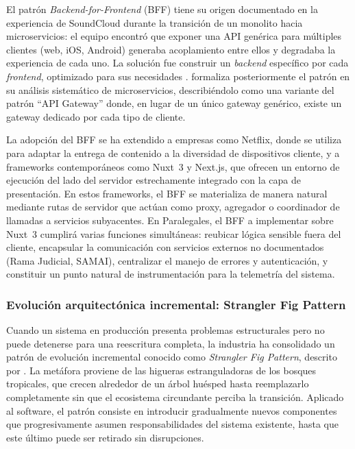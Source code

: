 El patrón \textit{Backend-for-Frontend} (BFF) tiene su origen documentado en la experiencia de SoundCloud durante la transición de un monolito hacia microservicios: el equipo encontró que exponer una API genérica para múltiples clientes (web, iOS, Android) generaba acoplamiento entre ellos y degradaba la experiencia de cada uno. La solución fue construir un \textit{backend} específico por cada \textit{frontend}, optimizado para sus necesidades \cite{NewmanBFF}. \textcite{Newman2021} formaliza posteriormente el patrón en su análisis sistemático de microservicios, describiéndolo como una variante del patrón ``API Gateway'' donde, en lugar de un único gateway genérico, existe un gateway dedicado por cada tipo de cliente.

La adopción del BFF se ha extendido a empresas como Netflix, donde se utiliza para adaptar la entrega de contenido a la diversidad de dispositivos cliente, y a frameworks contemporáneos como Nuxt~3 y Next.js, que ofrecen un entorno de ejecución del lado del servidor estrechamente integrado con la capa de presentación. En estos frameworks, el BFF se materializa de manera natural mediante rutas de servidor que actúan como proxy, agregador o coordinador de llamadas a servicios subyacentes. En Paralegales, el BFF a implementar sobre Nuxt~3 cumplirá varias funciones simultáneas: reubicar lógica sensible fuera del cliente, encapsular la comunicación con servicios externos no documentados (Rama Judicial, SAMAI), centralizar el manejo de errores y autenticación, y constituir un punto natural de instrumentación para la telemetría del sistema.

\subsubsection{Evolución arquitectónica incremental: Strangler Fig Pattern}

Cuando un sistema en producción presenta problemas estructurales pero no puede detenerse para una reescritura completa, la industria ha consolidado un patrón de evolución incremental conocido como \textit{Strangler Fig Pattern}, descrito por \textcite{Fowler2004Strangler}. La metáfora proviene de las higueras estranguladoras de los bosques tropicales, que crecen alrededor de un árbol huésped hasta reemplazarlo completamente sin que el ecosistema circundante perciba la transición. Aplicado al software, el patrón consiste en introducir gradualmente nuevos componentes que progresivamente asumen responsabilidades del sistema existente, hasta que este último puede ser retirado sin disrupciones.

